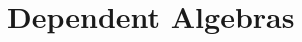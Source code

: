 \makeatother
\EndFmtInput
%

%
\makeatletter

\let\Varid\mathsf
\let\Conid\mathsf






\newcommand{\ty}[1]{\Conid{#1}}
\newcommand{\con}[1]{\Conid{#1}}
\newcommand{\id}[1]{\Varid{#1}}
\newcommand{\cl}[1]{\Varid{#1}}
\newcommand{\opsym}[1]{\mathrel{#1}}

\newcommand\Keyword[1]{\textbf{\textsf{#1}}}
\newcommand\Hide{\mathbin{\downarrow}}
\newcommand\Reveal{\mathbin{\uparrow}}


\makeatother
\EndFmtInput





\section{Dependent Algebras}
\label{sec:dependentAlg}

